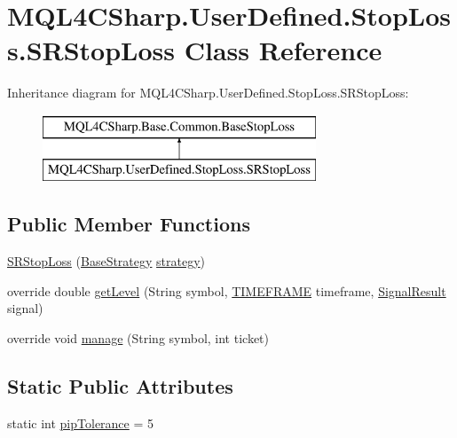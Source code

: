 \hypertarget{class_m_q_l4_c_sharp_1_1_user_defined_1_1_stop_loss_1_1_s_r_stop_loss}{}\section{M\+Q\+L4\+C\+Sharp.\+User\+Defined.\+Stop\+Loss.\+S\+R\+Stop\+Loss Class Reference}
\label{class_m_q_l4_c_sharp_1_1_user_defined_1_1_stop_loss_1_1_s_r_stop_loss}
Inheritance diagram for M\+Q\+L4\+C\+Sharp.\+User\+Defined.\+Stop\+Loss.\+S\+R\+Stop\+Loss\+:\begin{figure}[H]
\begin{center}
\leavevmode
\includegraphics[height=2.000000cm]{class_m_q_l4_c_sharp_1_1_user_defined_1_1_stop_loss_1_1_s_r_stop_loss}
\end{center}
\end{figure}
\subsection*{Public Member Functions}
\begin{DoxyCompactItemize}
\item 
\hyperlink{class_m_q_l4_c_sharp_1_1_user_defined_1_1_stop_loss_1_1_s_r_stop_loss_ae1ef5446eeb42676a45e45f426d2a059}{S\+R\+Stop\+Loss} (\hyperlink{class_m_q_l4_c_sharp_1_1_base_1_1_base_strategy}{Base\+Strategy} \hyperlink{class_m_q_l4_c_sharp_1_1_base_1_1_common_1_1_base_stop_loss_a8cbd2ea8e6ab4e5af253a32116905162}{strategy})
\item 
override double \hyperlink{class_m_q_l4_c_sharp_1_1_user_defined_1_1_stop_loss_1_1_s_r_stop_loss_afe0d85f511a66f949edfa5def41ce5dd}{get\+Level} (String symbol, \hyperlink{namespace_m_q_l4_c_sharp_1_1_base_1_1_enums_a838810aaa87c63c12737408dba8c0b35}{T\+I\+M\+E\+F\+R\+A\+ME} timeframe, \hyperlink{class_m_q_l4_c_sharp_1_1_base_1_1_common_1_1_signal_result}{Signal\+Result} signal)
\item 
override void \hyperlink{class_m_q_l4_c_sharp_1_1_user_defined_1_1_stop_loss_1_1_s_r_stop_loss_aff1fdf85c2678718b77eaf9f55575ae0}{manage} (String symbol, int ticket)
\end{DoxyCompactItemize}
\subsection*{Static Public Attributes}
\begin{DoxyCompactItemize}
\item 
static int \hyperlink{class_m_q_l4_c_sharp_1_1_user_defined_1_1_stop_loss_1_1_s_r_stop_loss_a5bc39c515d36392483ff79b2f00d4495}{pip\+Tolerance} = 5
\end{DoxyCompactItemize}
